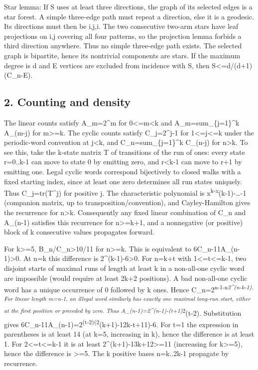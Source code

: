 \documentclass[
  10pt,
]{article}
\begin{document}
Star lemma: If S uses at least three directions, the graph of its
selected edges is a star forest. A simple three-edge path must repeat a
direction, else it is a geodesic. Its directions must then be i,j,i. The
two consecutive two-arm stars have leaf projections on i,j covering all
four patterns, so the projection lemma forbids a third direction
anywhere. Thus no simple three-edge path exists. The selected graph is
bipartite, hence its nontrivial components are stars. If the maximum
degree is d and E vertices are excluded from incidence with S, then
\textbar S\textbar\textless=d/(d+1)(C\_n-E).

\subsection{2. Counting and density}\label{counting-and-density}

The linear counts satisfy A\_m=2\^{}m for 0\textless=m\textless k and
A\_m=sum\_\{j=1\}\^{}k A\_(m-j) for m\textgreater=k. The cyclic counts
satisfy C\_j=2\^{}j-1 for 1\textless=j\textless=k under the
periodic-word convention at j\textless k, and C\_n=sum\_\{j=1\}\^{}k
C\_(n-j) for n\textgreater k. To see this, take the k-state matrix T of
transitions of the run of ones: every state r=0..k-1 can move to state 0
by emitting zero, and r\textless k-1 can move to r+1 by emitting one.
Legal cyclic words correspond bijectively to closed walks with a fixed
starting index, since at least one zero determines all run states
uniquely. Thus C\_j=tr(T\^{}j) for positive j. The characteristic
polynomial is x\textsuperscript{k-x}(k-1)-\ldots-1 (companion matrix, up
to transposition/convention), and Cayley-Hamilton gives the recurrence
for n\textgreater k. Consequently any fixed linear combination of C\_n
and A\_(n-1) satisfies this recurrence for n\textgreater=k+1, and a
nonnegative (or positive) block of k consecutive values propagates
forward.

For k\textgreater=5, B\_n/C\_n\textgreater10/11 for n\textgreater=k.
This is equivalent to 6C\_n-11A\_(n-1)\textgreater0. At n=k this
difference is 2\^{}(k-1)-6\textgreater0. For n=k+t with
1\textless=t\textless=k-1, two disjoint starts of maximal runs of length
at least k in a non-all-one cyclic word are impossible (would require at
least 2k+2 positions). A bad non-all-one cyclic word has a unique
occurrence of 0 followed by k ones. Hence
C\_n=2\textsuperscript{n-1-n\emph{2\^{}(n-k-1). For linear length m=n-1,
an illegal word similarly has exactly one maximal long-run start, either
at the first position or preceded by zero. Thus
A\_(n-1)=2\^{}(n-1)-(t+1)}2}(t-2). Substitution gives
6C\_n-11A\_(n-1)=2\textsuperscript{(t-2)(2}(k+1)-12k-t+11)-6. For t=1
the expression in parentheses is at least 14 (at k=5, increasing in k),
hence the difference is at least 1. For 2\textless=t\textless=k-1 it is
at least 2\^{}(k+1)-13k+12\textgreater=11 (increasing for
k\textgreater=5), hence the difference is \textgreater=5. The k positive
bases n=k..2k-1 propagate by recurrence.
\end{document}

